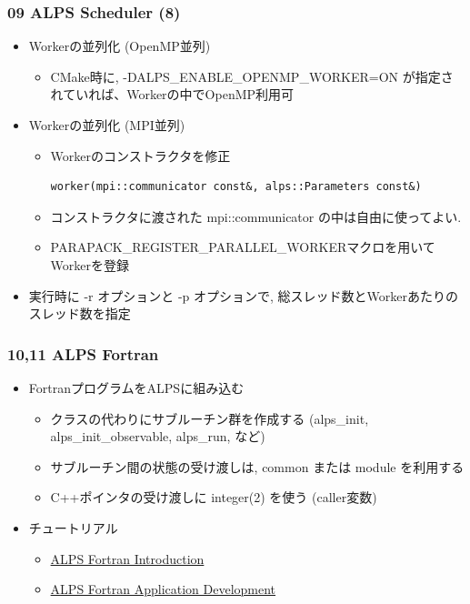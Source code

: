 \begin{frame}[fragile]
  \frametitle{09 ALPS Scheduler (8)}
  \begin{itemize}
    \item Workerの並列化 (OpenMP並列)
      \begin{itemize}
      \item CMake時に, -DALPS\_ENABLE\_OPENMP\_WORKER=ON が指定されていれば、Workerの中でOpenMP利用可
      \end{itemize}
    \item Workerの並列化 (MPI並列)
      \begin{itemize}
      \item Workerのコンストラクタを修正
\begin{lstlisting}
worker(mpi::communicator const&, alps::Parameters const&)
\end{lstlisting}
      \item コンストラクタに渡された mpi::communicator の中は自由に使ってよい.
      \item {\color{red} PARAPACK\_REGISTER\_PARALLEL\_WORKER}マクロを用いてWorkerを登録
      \end{itemize}
    \item 実行時に -r オプションと -p オプションで, 総スレッド数とWorkerあたりのスレッド数を指定
  \end{itemize}
\end{frame}

\begin{frame}[fragile]
  \frametitle{10,11 ALPS Fortran}
  \begin{itemize}
  \item FortranプログラムをALPSに組み込む
    \begin{itemize}
      \item クラスの代わりにサブルーチン群を作成する (alps\_init, alps\_init\_observable, alps\_run, など)
      \item サブルーチン間の状態の受け渡しは, common または module を利用する
      \item C++ポインタの受け渡しに integer(2) を使う (caller変数)
    \end{itemize}
  \item チュートリアル
  \begin{itemize}
    \item \href{http://alps.comp-phys.org/mediawiki/index.php/Tutorials:ALPS_Fortran_Introduction/ja}{ALPS Fortran Introduction}
    \item \href{http://alps.comp-phys.org/mediawiki/index.php/Tutorials:ALPS_Fortran_Application_Development/ja}{ALPS Fortran Application Development}
  \end{itemize}
  \end{itemize}
\end{frame}

